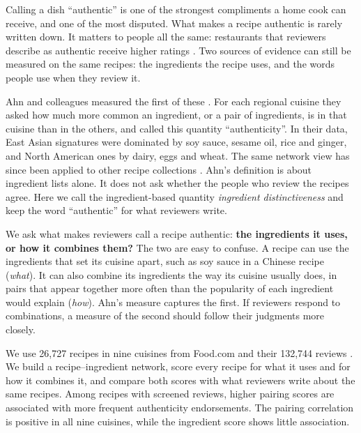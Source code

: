 Calling a dish ``authentic'' is one of the strongest compliments a home cook can receive, and one of the most disputed. What makes a recipe authentic is rarely written down. It matters to people all the same: restaurants that reviewers describe as authentic receive higher ratings \cite{kovacs2014authenticity}. Two sources of evidence can still be measured on the same recipes: the ingredients the recipe uses, and the words people use when they review it.

Ahn and colleagues measured the first of these \cite{ahn2011flavor}. For each regional cuisine they asked how much more common an ingredient, or a pair of ingredients, is in that cuisine than in the others, and called this quantity ``authenticity''. In their data, East Asian signatures were dominated by soy sauce, sesame oil, rice and ginger, and North American ones by dairy, eggs and wheat. The same network view has since been applied to other recipe collections \cite{teng2012recipe,jain2015spices}. Ahn's definition is about ingredient lists alone. It does not ask whether the people who review the recipes agree. Here we call the ingredient-based quantity \emph{ingredient distinctiveness} and keep the word ``authentic'' for what reviewers write.

We ask what makes reviewers call a recipe authentic: \textbf{the ingredients it uses, or how it combines them?} The two are easy to confuse. A recipe can use the ingredients that set its cuisine apart, such as soy sauce in a Chinese recipe (\emph{what}). It can also combine its ingredients the way its cuisine usually does, in pairs that appear together more often than the popularity of each ingredient would explain (\emph{how}). Ahn's measure captures the first. If reviewers respond to combinations, a measure of the second should follow their judgments more closely.

We use 26,727 recipes in nine cuisines from Food.com and their 132,744 reviews \cite{majumder2019generating}. We build a recipe--ingredient network, score every recipe for what it uses and for how it combines it, and compare both scores with what reviewers write about the same recipes. Among recipes with screened reviews, higher pairing scores are associated with more frequent authenticity endorsements. The pairing correlation is positive in all nine cuisines, while the ingredient score shows little association.\Endparasplit
